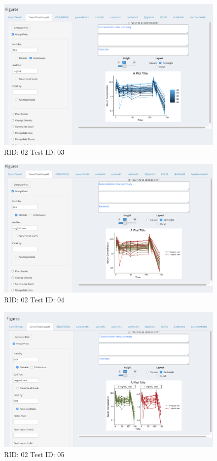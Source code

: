 \begin{figure}[H]
\includegraphics[width=.8\textwidth]{screencaps/02-03-1.png}
\caption{RID: 02 Test ID: 03}
\end{figure}
\begin{figure}[H]
\includegraphics[width=.8\textwidth]{screencaps/02-04-1.png}
\caption{RID: 02 Test ID: 04}
\end{figure}
\begin{figure}[H]
\includegraphics[width=.8\textwidth]{screencaps/02-05-1.png}
\caption{RID: 02 Test ID: 05}
\end{figure}
